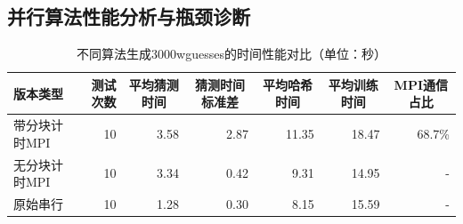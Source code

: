 \documentclass[a4paper]{article}
\begin{document}
\subsection{并行算法性能分析与瓶颈诊断}
\begin{table}[htbp]
\centering
\caption{不同算法生成3000wguesses的时间性能对比（单位：秒）}
\label{tab:performance}
\begin{tabular}{lrrrrrr}
\hline
版本类型 & 测试次数 & \multicolumn{1}{c}{平均猜测时间} & \multicolumn{1}{c}{猜测时间标准差} & \multicolumn{1}{c}{平均哈希时间} & \multicolumn{1}{c}{平均训练时间} & \multicolumn{1}{c}{MPI通信占比} \\ \hline
带分块计时MPI & 10 & 3.58 & 2.87 & 11.35 & 18.47 & 68.7\% \\
无分块计时MPI & 10 & 3.34 & 0.42 & 9.31 & 14.95 & - \\
原始串行 & 10 & 1.28 & 0.30 & 8.15 & 15.59 & - \\ \hline
\end{tabular}
\end{table}
\end{document}

